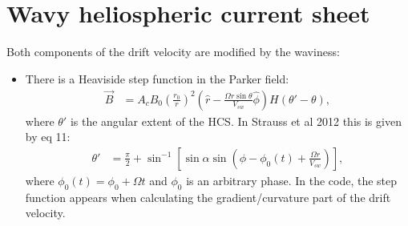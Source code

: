 \documentclass[11pt]{article}
\begin{document}
\section{Wavy heliospheric current sheet}

Both components of the drift velocity are modified by the waviness:
\begin{itemize}
    \item
        There is a Heaviside step function in the Parker field:
        \begin{align*}
            \vec{B} &= A_c B_0 \left( \frac{r_0}{r} \right)^2 \left( \hat{r} - \frac{\Omega r \sin\theta}{V_{sw}} \hat{\phi} \right) H(\theta' - \theta),
        \end{align*}
        where $\theta'$ is the angular extent of the HCS.  In Strauss et al 2012 this is given by eq 11:
        \begin{align*}
            \theta' &= \frac{\pi}{2} + \sin^{-1}\left[ \sin\alpha \sin\left( \phi - \phi_0(t) + \frac{\Omega r}{V_{sw}} \right) \right],
        \end{align*}
        where $\phi_0(t) = \phi_0 + \Omega t$ and $\phi_0$ is an arbitrary phase.  In the code, the step function appears when calculating the gradient/curvature part of the drift velocity.


\end{itemize}
\end{document}
